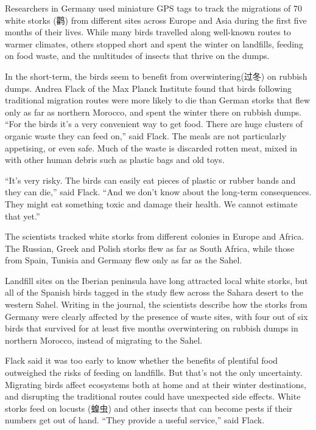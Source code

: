 \documentclass[UTF8,11pt]{ctexart}
\begin{document}
Researchers in Germany used miniature GPS tags to track the migrations of 70 white storks (鹳) from different sites across Europe and Asia during the first five months of their lives. While many birds travelled along well-known routes to warmer climates, others stopped short and spent the winter on landfills, feeding on food waste, and the multitudes of insects that thrive on the dumps.


In the short-term, the birds seem to benefit from overwintering(过冬) on rubbish dumps. Andrea Flack of the Max Planck Institute found that birds following traditional migration routes were more likely to die than German storks that flew only as far as northern Morocco, and spent the winter there on rubbish dumps. “For the birds it’s a very convenient way to get food. There are huge clusters of organic waste they can feed on,” said Flack. The meals are not particularly appetising, or even safe. Much of the waste is discarded rotten meat, mixed in with other human debris such as plastic bags and old toys.


“It’s very risky. The birds can easily eat pieces of plastic or rubber bands and they can die,” said Flack. “And we don’t know about the long-term consequences. They might eat something toxic and damage their health. We cannot estimate that yet.”


The scientists tracked white storks from different colonies in Europe and Africa. The Russian, Greek and Polish storks flew as far as South Africa, while those from Spain, Tunisia and Germany flew only as far as the Sahel.


Landfill sites on the Iberian peninsula have long attracted local white storks, but all of the Spanish birds tagged in the study flew across the Sahara desert to the western Sahel. Writing in the journal, the scientists describe how the storks from Germany were clearly affected by the presence of waste sites, with four out of six birds that survived for at least five months overwintering on rubbish dumps in northern Morocco, instead of migrating to the Sahel.


Flack said it was too early to know whether the benefits of plentiful food outweighed the risks of feeding on landfills. But that’s not the only uncertainty. Migrating birds affect ecosystems both at home and at their winter destinations, and disrupting the traditional routes could have unexpected side effects. White storks feed on locusts (蝗虫) and other insects that can become pests if their numbers get out of hand. “They provide a useful service,” said Flack.
\end{document}
